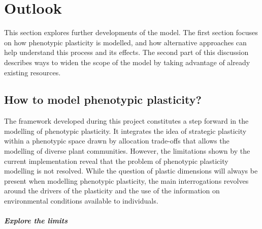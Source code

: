

\chapter{Outlook}

This section explores further developments of the model. The first section focuses on how phenotypic plasticity is modelled, and how alternative approaches can help understand this process and its effects. The second part of this discussion describes ways to widen the scope of the model by taking advantage of already existing resources.

\section{How to model phenotypic plasticity? }

The framework developed during this project constitutes a step forward in the modelling of phenotypic plasticity. It integrates the idea of strategic plasticity \parencite{bradshaw_evolutionary_1965, dewitt_expanding_2016} within a phenotypic space drawn by allocation trade-offs that allows the modelling of diverse plant communities. However, the limitations shown by the current implementation reveal that the problem of phenotypic plasticity modelling is not resolved. While the question of plastic dimensions will always be present when modelling phenotypic plasticity, the main interrogations revolves around the drivers of the plasticity and the use of the information on environmental conditions available to individuals. 


\paragraph{Explore the limits}

